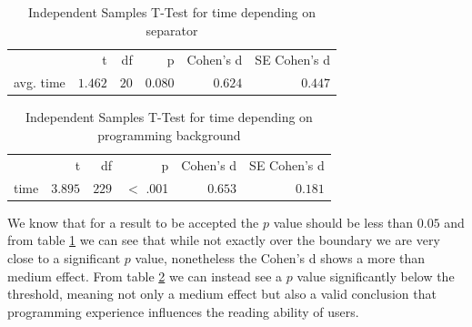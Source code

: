 \documentclass{article}
\begin{document}
\begin{table}[h]
    \centering
    \caption{Independent Samples T-Test for time depending on separator}
    \label{tab:independentSamplesT-TestSeparator}
    {
        \begin{tabular}{lrrrrr}
            \toprule
            $ $ & t & df & p & Cohen's d & SE Cohen's d  \\
            \cmidrule[0.4pt]{1-6}
            avg. time & $1.462$ & $20$ & $0.080$ & $0.624$ & $0.447$  \\
            \bottomrule
        \end{tabular}
    }
\end{table}

\begin{table}[h]
    \centering
    \caption{Independent Samples T-Test for time depending on programming background}
    \label{tab:independentSamplesT-TestProg}
    {
        \begin{tabular}{lrrrrr}
            \toprule
            $ $ & t & df & p & Cohen's d & SE Cohen's d  \\
            \cmidrule[0.4pt]{1-6}
            time & $3.895$ & $229$ & $<$ .001 & $0.653$ & $0.181$  \\
            \bottomrule
        \end{tabular}
    }
\end{table}

We know that for a result to be accepted the $p$ value should be less than $0.05$ and from table \ref{tab:independentSamplesT-TestSeparator} we can see that while not exactly over the boundary 
we are very close to a significant $p$ value, nonetheless the Cohen's d shows a more than medium effect. From table \ref{tab:independentSamplesT-TestProg} we can instead see a $p$ value significantly 
below the threshold, meaning not only a medium effect but also a valid conclusion that programming experience influences the reading ability of users.
\end{document}
